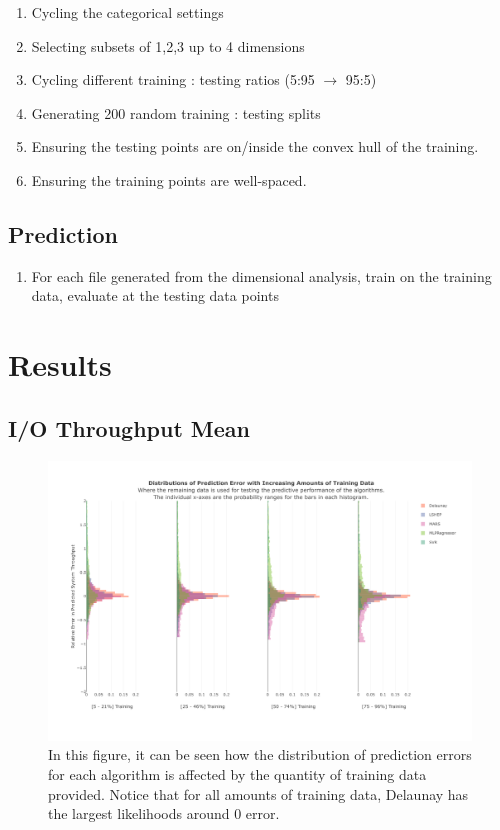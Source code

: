\documentclass{scspaperproc}
\theoremstyle{scsthe}
\begin{document}
\begin{enumerate}
\item Cycling the categorical settings
\item Selecting subsets of 1,2,3 up to 4 dimensions
\item Cycling different training : testing ratios (5:95 $\rightarrow$ 95:5)
\item Generating 200 random training : testing splits
\item Ensuring the testing points are on/inside the convex hull of the training.
\item Ensuring the training points are well-spaced.
\end{enumerate}

\subsection{Prediction}
\begin{enumerate}
\item For each file generated from the dimensional analysis, train on
  the training data, evaluate at the testing data points
\end{enumerate}


\section{Results}
\subsection{I/O Throughput Mean}


\begin{figure}
  \centering
  \includegraphics[width=\textwidth]{Prediction_Performance_TT_Ratio.pdf}
  \caption{In this figure, it can be seen how the distribution of
    prediction errors for each algorithm is affected by the quantity
    of training data provided. Notice that for all amounts of training
    data, Delaunay has the largest likelihoods around 0 error.}
  \label{fig:tt_ratio}
\end{figure}
\end{document}
